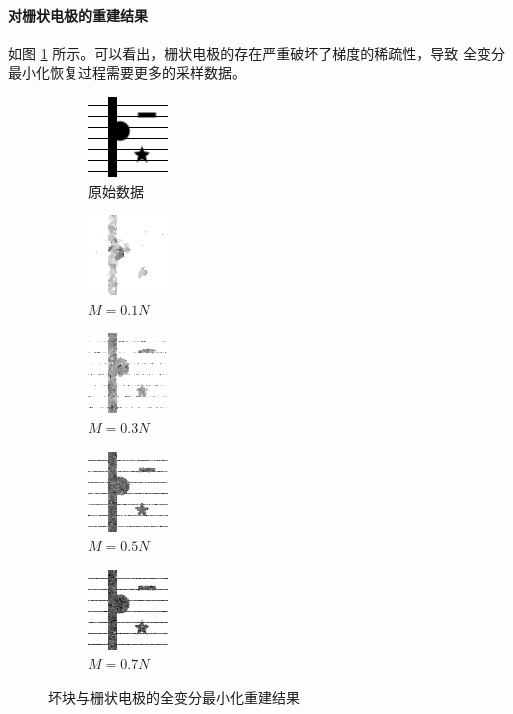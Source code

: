 \paragraph{对栅状电极的重建结果} 如图 \ref{fig:TVfinger}
所示。可以看出，栅状电极的存在严重破坏了梯度的稀疏性，导致
全变分最小化恢复过程需要更多的采样数据。

\begin{figure}
\centering
\begin{subfigure}[t]{1.1in}
	\includegraphics{Figure/testdata/2dsharp_finger.png}
	\caption{原始数据}
\end{subfigure}
\begin{subfigure}[t]{1.1in}
	\includegraphics{Figure/TV/finger10.png}
	\caption{$M = 0.1 N$}
\end{subfigure}
\begin{subfigure}[t]{1.1in}
	\includegraphics{Figure/TV/finger30.png}
	\caption{$M = 0.3 N$}
\end{subfigure}
\begin{subfigure}[t]{1.1in}
	\includegraphics{Figure/TV/finger50.png}
	\caption{$M = 0.5 N$}
\end{subfigure}
\begin{subfigure}[t]{1.1in}
	\includegraphics{Figure/TV/finger70.png}
	\caption{$M = 0.7 N$}
\end{subfigure}
\caption{坏块与栅状电极的全变分最小化重建结果}
\label{fig:TVfinger}
\end{figure}

